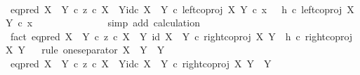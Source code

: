 \begin{isabellebody}
\ \ \ \ \ \ \isamarkupfalse%
\ \isamarkupfalse%
\ {\isachardoublequoteopen}{\isacharparenleft}{\kern0pt}{\isacharparenleft}{\kern0pt}eq{\isacharunderscore}{\kern0pt}pred\ {\isacharparenleft}{\kern0pt}X\ {\isasymCoprod}\ Y{\isacharparenright}{\kern0pt}\ {\isasymcirc}\isactrlsub c\ {\isasymlangle}z\ {\isasymcirc}\isactrlsub c\ {\isasymbeta}\isactrlbsub X\ {\isasymCoprod}\ Y\isactrlesub {\isacharcomma}{\kern0pt}id\isactrlsub c\ {\isacharparenleft}{\kern0pt}X\ {\isasymCoprod}\ Y{\isacharparenright}{\kern0pt}{\isasymrangle}{\isacharparenright}{\kern0pt}\ {\isasymcirc}\isactrlsub c\ left{\isacharunderscore}{\kern0pt}coproj\ X\ Y{\isacharparenright}{\kern0pt}\ {\isasymcirc}\isactrlsub c\ x\ \ {\isacharequal}{\kern0pt}\ {\isacharparenleft}{\kern0pt}h\ {\isasymcirc}\isactrlsub c\ left{\isacharunderscore}{\kern0pt}coproj\ X\ Y{\isacharparenright}{\kern0pt}\ {\isasymcirc}\isactrlsub c\ x{\isachardoublequoteclose}\isanewline
\ \ \ \ \ \ \ \ \ \ \ \ \ \isamarkupfalse%
\ {\isacharparenleft}{\kern0pt}simp\ add{\isacharcolon}{\kern0pt}\ calculation{\isacharparenright}{\kern0pt}\isanewline
\ \ \ \ \isamarkupfalse%
\isanewline
\ \ \isamarkupfalse%
\isanewline
\isanewline
\ \ \isamarkupfalse%
\ fact{}{\isacharcolon}{\kern0pt}\ {\isachardoublequoteopen}{\isacharparenleft}{\kern0pt}eq{\isacharunderscore}{\kern0pt}pred\ {\isacharparenleft}{\kern0pt}X\ {\isasymCoprod}\ Y{\isacharparenright}{\kern0pt}\ {\isasymcirc}\isactrlsub c\ {\isasymlangle}z\ {\isasymcirc}\isactrlsub c\ {\isasymbeta}\isactrlbsub X\ {\isasymCoprod}\ Y\isactrlesub {\isacharcomma}{\kern0pt}\ id\ {\isacharparenleft}{\kern0pt}X\ {\isasymCoprod}\ Y{\isacharparenright}{\kern0pt}{\isasymrangle}{\isacharparenright}{\kern0pt}\ {\isasymcirc}\isactrlsub c\ right{\isacharunderscore}{\kern0pt}coproj\ X\ Y\ {\isacharequal}{\kern0pt}\ h\ {\isasymcirc}\isactrlsub c\ right{\isacharunderscore}{\kern0pt}coproj\ X\ Y{\isachardoublequoteclose}\isanewline
\ \ \isamarkupfalse%
{\isacharparenleft}{\kern0pt}rule\ one{\isacharunderscore}{\kern0pt}separator{\isacharbrackleft}{\kern0pt}\ X\ {\isacharequal}{\kern0pt}\ Y{\isacharcomma}{\kern0pt}\ \ Y\ {\isacharequal}{\kern0pt}\ {\isasymOmega}{\isacharbrackright}{\kern0pt}{\isacharparenright}{\kern0pt}\isanewline
\ \ \ \ \isamarkupfalse%
\ {\isachardoublequoteopen}{\isacharparenleft}{\kern0pt}eq{\isacharunderscore}{\kern0pt}pred\ {\isacharparenleft}{\kern0pt}X\ {\isasymCoprod}\ Y{\isacharparenright}{\kern0pt}\ {\isasymcirc}\isactrlsub c\ {\isasymlangle}z\ {\isasymcirc}\isactrlsub c\ {\isasymbeta}\isactrlbsub X\ {\isasymCoprod}\ Y\isactrlesub {\isacharcomma}{\kern0pt}id\isactrlsub c\ {\isacharparenleft}{\kern0pt}X\ {\isasymCoprod}\ Y{\isacharparenright}{\kern0pt}{\isasymrangle}{\isacharparenright}{\kern0pt}\ {\isasymcirc}\isactrlsub c\ right{\isacharunderscore}{\kern0pt}coproj\ X\ Y\ {\isacharcolon}{\kern0pt}\ Y\ {\isasymrightarrow}\ {\isasymOmega}{\isachardoublequoteclose}\isanewline

\end{isabellebody}

